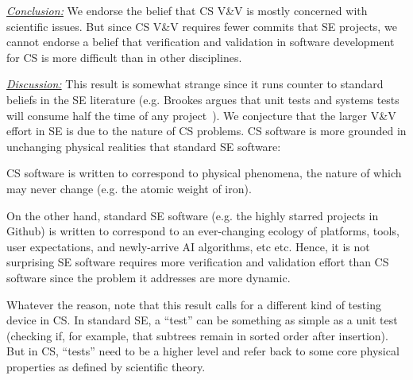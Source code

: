 \noindent \textit{\underline{Conclusion:}}
We endorse the belief that CS V\&V is mostly concerned with scientific issues. But since CS V\&V requires fewer commits
that SE projects, we cannot endorse a belief that 
verification and validation in software development for CS is more difficult than in other disciplines.

\noindent \textit{\underline{Discussion:}}
This result is somewhat strange since it runs counter to standard beliefs in the SE literature (e.g. Brookes argues that unit tests and systems tests will consume half the time of any project~\cite{brooks1995mythical}).
We conjecture that the larger V\&V effort in SE  is due to the nature of CS problems.  CS software is more grounded in unchanging physical realities that standard SE software:
\bi
\item
CS software is written to correspond to physical phenomena, the nature of which may never change (e.g. the atomic weight of iron).
\item
On the other hand, standard SE software (e.g. the highly starred projects in Github) is written to correspond to an ever-changing ecology of platforms, tools, user expectations, and newly-arrive AI algorithms, etc etc.   
Hence, it is not surprising  SE software requires more verification and validation effort than CS software since the problem it addresses are more dynamic.
\ei

Whatever the reason, 
note that this result calls for a different kind of testing device in CS.  In standard SE, a ``test'' can be something as simple as a unit test (checking if, for example, that subtrees remain in sorted order after insertion).
But in CS, ``tests'' need to be a higher level and refer back to some core physical properties as defined
by scientific theory.  